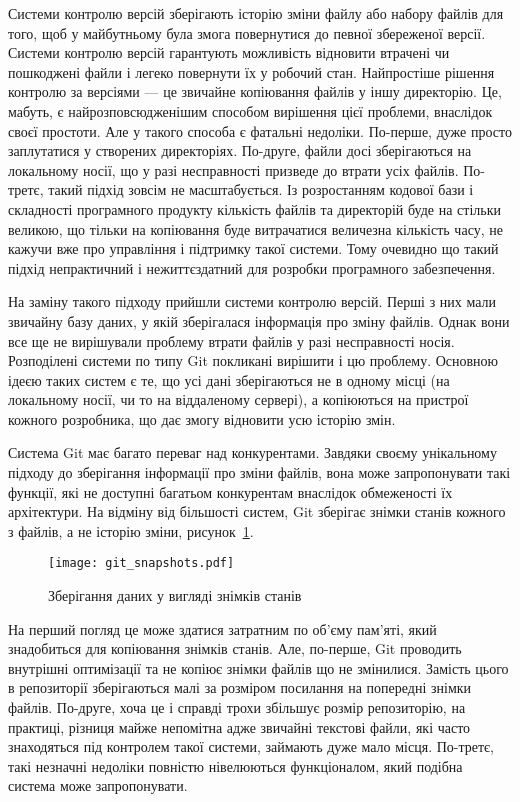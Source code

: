 Системи контролю версій зберігають історію зміни файлу або набору файлів для того,
щоб у майбутньому була змога
повернутися до певної збереженої версії. Системи контролю версій гарантують можливість
відновити втрачені чи пошкоджені файли і легеко повернути їх у робочий стан. Найпростіше
рішення контролю за версіями --- це звичайне копіювання файлів у іншу директорію. Це, мабуть,
є найрозповсюдженішим способом вирішення цієї проблеми, внаслідок своєї простоти.
Але у такого способа є фатальні недоліки. По-перше, дуже просто заплутатися у створених
директоріях. По-друге, файли досі зберігаються на локальному носії, що у разі
несправності призведе до втрати усіх файлів. По-третє, такий підхід зовсім 
не масштабується. Із розростанням кодової бази і складності програмного продукту кількість
файлів та директорій буде на стільки великою, що тільки на копіювання буде витрачатися
величезна кількість часу, не кажучи вже про управління і підтримку такої системи.
Тому очевидно що такий підхід непрактичний і нежиттєздатний для розробки програмного
забезпечення.

На заміну такого підходу прийшли системи контролю версій. Перші з них мали звичайну
базу даних, у якій зберігалася інформація про зміну файлів. Однак вони все ще не
вирішували проблему втрати файлів у разі несправності носія. Розподілені системи
по типу Git покликані вирішити і цю проблему. Основною ідеєю таких систем є те, що
усі дані зберігаються не в одному місці (на локальному носії, чи то на віддаленому
сервері), а копіюються на пристрої кожного розробника, що дає змогу відновити усю історію
змін.

Система Git має багато переваг над конкурентами. Завдяки своєму унікальному підходу
до зберігання інформації про зміни файлів, вона може запропонувати такі функції,
які не доступні багатьом конкурентам внаслідок обмеженості їх архітектури.
На відміну від більшості систем, Git зберігає знімки станів кожного з файлів, а не історію
зміни, рисунок~\ref{img:git_snapshots}.

\begin{figure}[ht]
  \begin{center}
    \texttt{[image: git\_snapshots.pdf]}
  \end{center}
  \caption{Зберігання даних у вигляді знімків станів}
  \label{img:git_snapshots}
\end{figure}

На перший погляд це може здатися затратним по об'єму пам'яті, який знадобиться для 
копіювання знімків станів. Але, по-перше,
Git проводить внутрішні оптимізації та не копіює знімки
файлів що не змінилися. Замість цього в репозиторії зберігаються малі за розміром посилання
на попередні знімки файлів. По-друге, хоча це і справді трохи збільшує розмір репозиторію,
на практиці, різниця майже непомітна адже звичайні текстові файли, які часто знаходяться
під контролем такої системи, займають дуже мало місця. По-третє, такі незначні недоліки
повністю нівелюються функціоналом, який подібна система може запропонувати.

